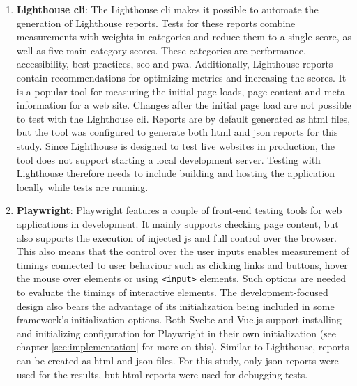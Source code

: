 \documentclass[a4paper, 12pt]{article}
\begin{document}
\begin{enumerate}
  \item \textbf{Lighthouse \acrshort{cli}}: The Lighthouse \acrshort{cli} makes it possible to automate the generation of Lighthouse reports.
  Tests for these reports combine measurements with weights in categories and reduce them to a single score, as well as five main category scores.
  These categories are performance, accessibility, best practices, \acrshort{seo} and \acrshort{pwa}.
  Additionally, Lighthouse reports contain recommendations for optimizing metrics and increasing the scores.
  It is a popular tool for measuring the initial page loads, page content and meta information for a web site.
  Changes after the initial page load are not possible to test with the Lighthouse \acrshort{cli}.
  Reports are by default generated as \acrshort{html} files, but the tool was configured to generate both \acrshort{html} and \acrshort{json} reports for this study.
  Since Lighthouse is designed to test live websites in production, the tool does not support starting a local development server.
  Testing with Lighthouse therefore needs to include building and hosting the application locally while tests are running.
  \item \textbf{Playwright}: Playwright features a couple of front-end testing tools for web applications in development.
  It mainly supports checking page content, but also supports the execution of injected \acrlong{js} and full control over the browser.
  This also means that the control over the user inputs enables measurement of timings connected to user behaviour such as clicking links and buttons, hover the mouse over elements or using \verb|<input>| elements.
  Such options are needed to evaluate the timings of interactive elements.
  The development-focused design also bears the advantage of its initialization being included in some framework's initialization options.
  Both Svelte and Vue.js support installing and initializing configuration for Playwright in their own initialization (see chapter \ref{sec:implementation} for more on this).
  Similar to Lighthouse, reports can be created as \acrshort{html} and \acrshort{json} files.
  For this study, only \acrshort{json} reports were used for the results, but \acrshort{html} reports were used for debugging tests.
\end{enumerate}
\end{document}
